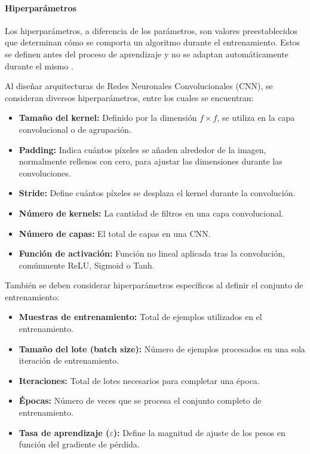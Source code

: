                 \paragraph{Hiperparámetros}
                    Los hiperparámetros, a diferencia de los parámetros, son valores preestablecidos que determinan cómo se comporta un algoritmo durante el entrenamiento. Estos se definen antes del proceso de aprendizaje y no se adaptan automáticamente durante el mismo \autocite{Goodfellow2016}.
                    
                    Al diseñar arquitecturas de Redes Neuronales Convolucionales (CNN), se consideran diversos hiperparámetros, entre los cuales se encuentran:
                    
                    \begin{itemize}
                        \item[-] \textbf{Tamaño del kernel:} Definido por la dimensión \( f \times f \), se utiliza en la capa convolucional o de agrupación.
                        \item[-] \textbf{Padding:} Indica cuántos píxeles se añaden alrededor de la imagen, normalmente rellenos con cero, para ajustar las dimensiones durante las convoluciones.
                        \item[-] \textbf{Stride:} Define cuántos píxeles se desplaza el kernel durante la convolución.
                        \item[-] \textbf{Número de kernels:} La cantidad de filtros en una capa convolucional.
                        \item[-] \textbf{Número de capas:} El total de capas en una CNN.
                        \item[-] \textbf{Función de activación:} Función no lineal aplicada tras la convolución, comúnmente ReLU, Sigmoid o Tanh.
                    \end{itemize}
                    
                    También se deben considerar hiperparámetros específicos al definir el conjunto de entrenamiento:
                    
                    \begin{itemize}
                        \item[-] \textbf{Muestras de entrenamiento:} Total de ejemplos utilizados en el entrenamiento.
                        \item[-] \textbf{Tamaño del lote (batch size):} Número de ejemplos procesados en una sola iteración de entrenamiento.
                        \item[-] \textbf{Iteraciones:} Total de lotes necesarios para completar una época.
                        \item[-] \textbf{Épocas:} Número de veces que se procesa el conjunto completo de entrenamiento.
                        \item[-] \textbf{Tasa de aprendizaje (\( \varepsilon \)):} Define la magnitud de ajuste de los pesos en función del gradiente de pérdida.
                    \end{itemize}
                    
